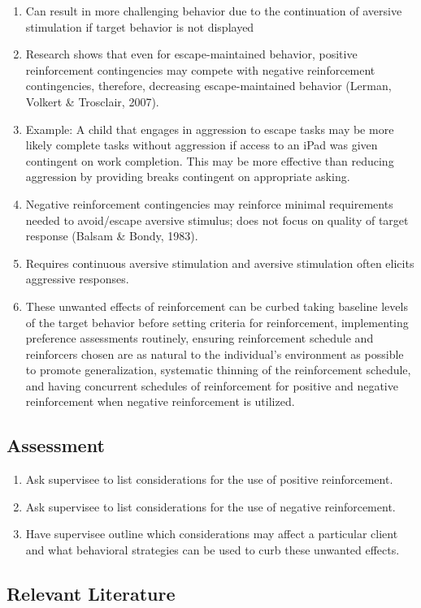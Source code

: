 \begin{enumerate}
\item Can result in more challenging behavior due to the continuation of aversive stimulation if target behavior is not displayed 
\item Research shows that even for escape-maintained behavior, positive reinforcement contingencies may compete with negative reinforcement contingencies, therefore, decreasing escape-maintained behavior (Lerman, Volkert \& Trosclair, 2007). 
\item Example: A child that engages in aggression to escape tasks may be more likely complete tasks without aggression if access to an iPad was given contingent on work completion. This may be more effective than reducing aggression by providing breaks contingent on appropriate asking.
\item Negative reinforcement contingencies may reinforce minimal requirements needed to avoid/escape aversive stimulus; does not focus on quality of target response (Balsam \& Bondy, 1983).
\item Requires continuous aversive stimulation and aversive stimulation often elicits aggressive responses.
\item These unwanted effects of reinforcement can be curbed taking baseline levels of the target behavior before setting criteria for reinforcement, implementing preference assessments routinely, ensuring reinforcement schedule and reinforcers chosen are as natural to the individual's environment as possible to promote generalization, systematic thinning of the reinforcement schedule, and having concurrent schedules of reinforcement for positive and negative reinforcement when negative reinforcement is utilized.
\end{enumerate}
%
\subsection{Assessment}
\begin{enumerate}
\item Ask supervisee to list considerations for the use of positive reinforcement.
\item Ask supervisee to list considerations for the use of negative reinforcement.
\item Have supervisee outline which considerations may affect a particular client and what behavioral strategies can be used to curb these unwanted effects.
\end{enumerate}
%
\subsection{Relevant Literature}
\begin{refsection}
\nocite{balsam1983negative,
    flora2004power,
    kodak2007further,
    riordan1980behavioral}
\printbibliography[heading=none]
\end{refsection}
%
